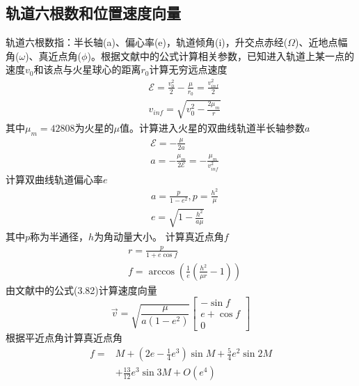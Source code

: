 \subsection{轨道六根数和位置速度向量}
轨道六根数指：半长轴(a)、偏心率(e)，轨道倾角(i)，升交点赤经($\Omega$)、近地点幅角($\omega$)、真近点角($\phi$)。根据文献\cite{mruiter2012}中的公式计算相关参数，已知进入轨道上某一点的速度$v_0$和该点与火星球心的距离$r_0$计算无穷远点速度
\[\begin{aligned}
    &\mathcal{E}=\frac{v_0^2}{2}-\frac{\mu}{r_0} = \frac{v_{inf}^2}{2} \\
    &v_{inf}=\sqrt{v_0^2-\frac{2\mu_m}{r}}
\end{aligned}\]
其中$\mu_m=42808$为火星的$\mu$值。计算进入火星的双曲线轨道半长轴参数$a$
\[\begin{aligned}
    &\mathcal{E}=-\frac{\mu}{2a} \\
    &a=-\frac{\mu_m}{2\mathcal{E}}=-\frac{\mu_m}{v_{inf}^2}
\end{aligned}\]
计算双曲线轨道偏心率$e$
\[\begin{aligned}
    &a=\frac{p}{1-e^2},p=\frac{h^2}{\mu} \\
    &e=\sqrt{1-\frac{h^2}{a\mu}}
\end{aligned}\]
其中$p$称为半通径，$h$为角动量大小。
计算真近点角$f$
\[\begin{aligned}
    &r=\frac{p}{1+e\cos f} \\
    &f=\arccos(\frac{1}{e}(\frac{h^2}{\mu r}-1))
\end{aligned}\]
由文献\cite{mruiter2012}中的公式(3.82)计算速度向量
\[
    \vec{v}=\sqrt{\frac{\mu}{a(1-e^2)}}
    \left[\begin{matrix}
        -\sin f \\ e+\cos f \\ 0
    \end{matrix}\right]
\]
根据平近点角计算真近点角\cite{msmart1977}
\begin{align*}
    f =& M+\left(2e-{\frac {1}{4}}e^{3}\right)\sin {M}
    + {\frac {5}{4}}e^{2}\sin {2M} \\
    &+ {\frac {13}{12}}e^{3}\sin {3M}+O(e^{4})
\end{align*}
